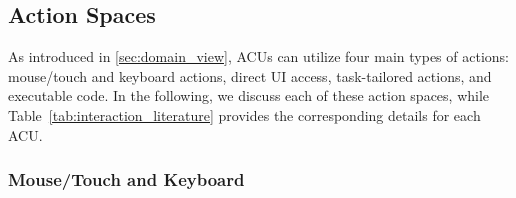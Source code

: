 
\subsection{Action Spaces} \label{sec:action_space}

As introduced in \cref{sec:domain_view}, ACUs can utilize four main types of actions: mouse/touch and keyboard actions, direct UI access, task-tailored actions, and executable code. 
In the following, we discuss each of these action spaces, while Table~\ref{tab:interaction_literature} provides the corresponding details for each ACU.


\subsubsection{Mouse/Touch and Keyboard}\label{sec:action_space_mouse}

